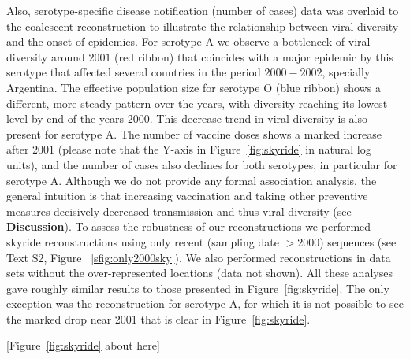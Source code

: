 \documentclass[10pt]{article}
\begin{document}
Also, serotype-specific disease notification (number of cases) data was overlaid to the coalescent reconstruction to illustrate the relationship between viral diversity and the onset of epidemics. 
For serotype A we observe a bottleneck of viral diversity around $2001$ (red ribbon) that coincides with a major epidemic by this serotype that affected several countries in the period $2000-2002$, specially Argentina.
The effective population size for serotype O (blue ribbon) shows a different, more steady pattern over the years, with diversity reaching its lowest level by end of the years $2000$.
This decrease trend in viral diversity is also present for serotype A.
The number of vaccine doses shows a marked increase after $2001$ (please note that the Y-axis in Figure~\ref{fig:skyride} in natural log units), and the number of cases also declines for both serotypes, in particular for serotype A.
Although we do not provide any formal association analysis, the general intuition is that increasing vaccination and taking other preventive measures decisively decreased transmission and thus viral diversity (see \textbf{Discussion}).
To assess the robustness of our reconstructions we performed skyride reconstructions using only recent (sampling date $>2000$) sequences (see Text S2, Figure ~\ref{sfig:only2000sky}).
We also performed reconstructions in data sets without the over-represented locations (data not shown).
All these analyses gave roughly similar results to those presented in Figure~\ref{fig:skyride}.
The only exception was the reconstruction for serotype A, for which it is not possible to see the marked drop near 2001 that is clear in Figure~\ref{fig:skyride}. 


\begin{center}
 [Figure~\ref{fig:skyride} about here]
\end{center}
\end{document}

